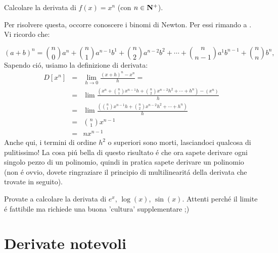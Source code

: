 \begin{esercizio}
Calcolare la derivata di $f(x)=x^n$ (con $n \in \mathbf{N}^+$).

Per risolvere questa, occorre conoscere i binomi di Newton. Per essi rimando a . Vi ricordo che:

\begin{equation}
(a+b)^n=\binom{n}{0}a^n+\binom{n}{1}a^{n-1}b^1+\binom{n}{2}a^{n-2}b^2+\cdots+\binom{n}{n-1}a^1b^{n-1}+\binom{n}{n}b^n,
\end{equation}
Sapendo ci\'o, usiamo la definizione di derivata:
\begin{eqnarray}
D[x^n]  & = & \lim_{h \rightarrow 0}\frac{(x+h)^n-x^n}{h} = \\
	& = & \lim \frac{(x^n+\binom{n}{1}x^{n-1}h+\binom{n}{2}x^{n-2}h^2+\cdots+h^n) - (x^n) }{h} \\
	& = & \lim \frac{(\binom{n}{1}x^{n-1}h+\binom{n}{2}x^{n-2}h^2+\cdots+h^n)}{h} \\
	& = & \binom{n}{1}x^{n-1} \\
	& = & nx^{n-1}
\end{eqnarray}
Anche qui, i termini di ordine $h^2$ o superiori sono morti, lasciandoci qualcosa di pulitissimo! La cosa pi\'u bella di questo
risultato \'e che ora sapete derivare ogni singolo pezzo di un polinomio, quindi in pratica sapete derivare un polinomio (non \'e
ovvio, dovete ringraziare il principio di multilinearit\'a della derivata che trovate in seguito).
\end{esercizio}

\begin{esercizio}
Provate a calcolare la derivata di $e^x$, $\log(x)$, $\sin(x)$. Attenti perch\'e il limite \'e fattibile ma richiede una
buona 'cultura' supplementare ;)
\end{esercizio}

\section{Derivate notevoli}

